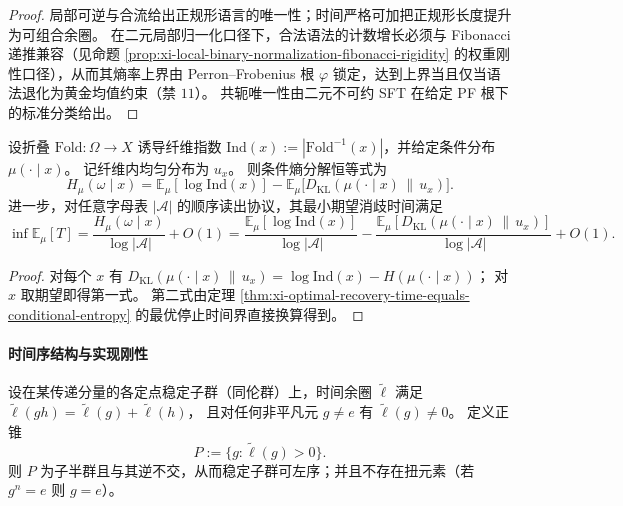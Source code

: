 \begin{proof}
局部可逆与合流给出正规形语言的唯一性；时间严格可加把正规形长度提升为可组合余圈。
在二元局部归一化口径下，合法语法的计数增长必须与 Fibonacci 递推兼容（见命题 \ref{prop:xi-local-binary-normalization-fibonacci-rigidity} 的权重刚性口径），从而其熵率上界由 Perron--Frobenius 根 \(\varphi\) 锁定，达到上界当且仅当语法退化为黄金均值约束（禁 \(11\)）。
共轭唯一性由二元不可约 SFT 在给定 PF 根下的标准分类给出。
\end{proof}

\begin{proposition}\label{prop:xi-min-disambiguation-time-entropy-decomposition}
设折叠 \(\mathrm{Fold}:\Omega\to X\) 诱导纤维指数 \(\mathrm{Ind}(x):=|\mathrm{Fold}^{-1}(x)|\)，并给定条件分布 \(\mu(\cdot\mid x)\)。
记纤维内均匀分布为 \(u_x\)。
则条件熵分解恒等式为
\[
H_\mu(\omega\mid x)
=\mathbb E_\mu[\log \mathrm{Ind}(x)]
-\mathbb E_\mu\!\bigl[D_{\mathrm{KL}}(\mu(\cdot\mid x)\,\|\,u_x)\bigr].
\]
进一步，对任意字母表 \(|\mathcal A|\) 的顺序读出协议，其最小期望消歧时间满足
\[
\inf \mathbb E_\mu[T]
=
\frac{H_\mu(\omega\mid x)}{\log|\mathcal A|}+O(1)
=
\frac{\mathbb E_\mu[\log \mathrm{Ind}(x)]}{\log|\mathcal A|}
-\frac{\mathbb E_\mu[D_{\mathrm{KL}}(\mu(\cdot\mid x)\,\|\,u_x)]}{\log|\mathcal A|}
+O(1).
\]
\end{proposition}

\begin{proof}
对每个 \(x\) 有
\(
D_{\mathrm{KL}}(\mu(\cdot\mid x)\,\|\,u_x)=\log\mathrm{Ind}(x)-H(\mu(\cdot\mid x))
\)；
对 \(x\) 取期望即得第一式。
第二式由定理 \ref{thm:xi-optimal-recovery-time-equals-conditional-entropy} 的最优停止时间界直接换算得到。
\end{proof}

\paragraph{时间序结构与实现刚性}

\begin{proposition}\label{prop:xi-time-positive-cocycle-left-order-torsionfree}
设在某传递分量的各定点稳定子群（同伦群）上，时间余圈 \(\widetilde{\ell}\) 满足
\(\widetilde{\ell}(gh)=\widetilde{\ell}(g)+\widetilde{\ell}(h)\)，
且对任何非平凡元 \(g\neq e\) 有 \(\widetilde{\ell}(g)\neq 0\)。
定义正锥
\[
P:=\{g:\widetilde{\ell}(g)>0\}.
\]
则 \(P\) 为子半群且与其逆不交，从而稳定子群可左序；并且不存在扭元素（若 \(g^n=e\) 则 \(g=e\)）。
\end{proposition}

